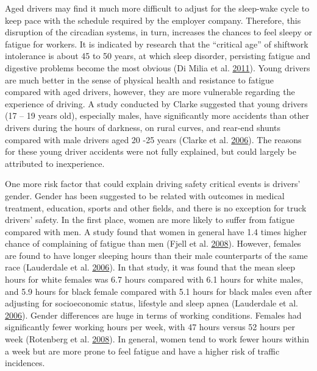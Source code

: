 \documentclass[12pt]{book}
\numberwithin{equation}{chapter}
\begin{document}
Aged drivers may find it much more difficult to adjust for the sleep-wake cycle to keep pace with the schedule required by the employer company. Therefore, this disruption of the circadian systems, in turn, increases the chances to feel sleepy or fatigue for workers. It is indicated by research that the ``critical age'' of shiftwork intolerance is about 45 to 50 years, at which sleep disorder, persisting fatigue and digestive problems become the most obvious (Di Milia et al. \protect\hyperlink{ref-di2011demographic}{2011}). Young drivers are much better in the sense of physical health and resistance to fatigue compared with aged drivers, however, they are more vulnerable regarding the experience of driving. A study conducted by Clarke suggested that young drivers (17 -- 19 years old), especially males, have significantly more accidents than other drivers during the hours of darkness, on rural curves, and rear-end shunts compared with male drivers aged 20 -25 years (Clarke et al. \protect\hyperlink{ref-clarke2006young}{2006}). The reasons for these young driver accidents were not fully explained, but could largely be attributed to inexperience.

One more risk factor that could explain driving safety critical events is drivers' gender. Gender has been suggested to be related with outcomes in medical treatment, education, sports and other fields, and there is no exception for truck drivers' safety. In the first place, women are more likely to suffer from fatigue compared with men. A study found that women in general have 1.4 times higher chance of complaining of fatigue than men (Fjell et al. \protect\hyperlink{ref-fjell2008perceived}{2008}). However, females are found to have longer sleeping hours than their male counterparts of the same race (Lauderdale et al. \protect\hyperlink{ref-lauderdale2006objectively}{2006}). In that study, it was found that the mean sleep hours for white females was 6.7 hours compared with 6.1 hours for white males, and 5.9 hours for black female compared with 5.1 hours for black males even after adjusting for socioeconomic status, lifestyle and sleep apnea (Lauderdale et al. \protect\hyperlink{ref-lauderdale2006objectively}{2006}). Gender differences are huge in terms of working conditions. Females had significantly fewer working hours per week, with 47 hours versus 52 hours per week (Rotenberg et al. \protect\hyperlink{ref-rotenberg2008gender}{2008}). In general, women tend to work fewer hours within a week but are more prone to feel fatigue and have a higher risk of traffic incidences.
\end{document}
